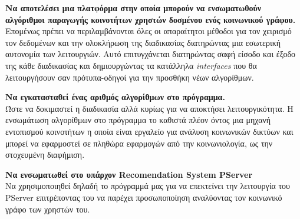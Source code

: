 \begin{description}
\item \textbf{Να αποτελέσει μια πλατφόρμα στην οποία μπορούν να ενσωματωθούν αλγόριθμοι παραγωγής κοινοτήτων χρηστών δοσμένου ενός κοινωνικού γράφου.}  \hfill \\
Επομένως πρέπει να περιλαμβάνονται όλες οι απαραίτητοι μέθοδοι για τον χειρισμό τον δεδομένων και την ολοκλήρωση της διαδικασίας διατηρώντας μια εσωτερική αυτονομία των λειτουργιών.
Αυτό επιτυγχάνεται διατηρώντας σαφή είσοδο και έξοδο της κάθε διαδικασίας και δημιουργώντας τα κατάλληλα \emph{interfaces} που θα λειτουργήσουν σαν πρότυπα-οδηγοί για την προσθήκη
νέων αλγορίθμων.
\item \textbf{Να εγκατασταθεί ένας αριθμός αλγορίθμων στο πρόγραμμα.}  \hfill \\
Ώστε να δοκιμαστεί η διαδικασία αλλά κυρίως για να αποκτήσει λειτουργικότητα. Η ενσωμάτωση αλγορίθμων στο πρόγραμμα το καθιστά πλέον όντος μια μηχανή εντοπισμού
κοινοτήτων η οποία είναι εργαλείο για ανάλυση κοινωνικών δικτύων και μπορεί να εφαρμοστεί σε πληθώρα εφαρμογών από την κοινωνιολογία, ως την στοχευμένη διαφήμιση.
\item \textbf{Να ενσωματωθεί στο υπάρχον Recomendation System PServer}  \hfill \\
Να χρησιμοποιηθεί δηλαδή το πρόγραμμά μας για να επεκτείνει την λειτουργία του PServer επιτρέποντας του να παρέχει προσωποποίηση αναλύοντας τον κοινωνικό γράφο των χρηστών του.
\end{description} 


